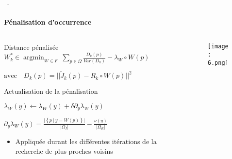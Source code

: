 \documentclass[aspectratio=169, 22pt]{beamer}
\DeclareMathOperator*{\argmin}{argmin}
\begin{document}
\begin{frame}{\secname~- \subsecname}
  \framesubtitle{Pénalisation d'occurrence}
  \begin{columns}
    \begin{column}{0.5\linewidth}
      \begin{block}{Distance pénalisée}
        \centering
        \small
        $W_k^* \in \argmin_{W \in F}\ \sum_{p \in \Omega} \frac{D_k(p)}{Var(D_k)} - \lambda_W \circ W(p)$
        
        $\text{avec} \quad D_k(p) = ||\tilde{J}_k(p) - R_k \circ W(p)||^2$
      \end{block}
      \vspace{1em}
      \begin{block}{Actualisation de la pénalisation}
        \small
        \begin{center}
          $\lambda_W(y) \leftarrow \lambda_W(y) + \delta \partial_y \lambda_W(y) $
          
          $\partial_y\lambda_W(y) = \frac{\lvert\left\{p\ |\ y =
              W(p)\right\}\rvert}{\lvert\Omega_I\rvert} -
          \frac{\nu(y)}{\lvert\Omega_R\rvert}$
        \end{center}
        
        \begin{itemize}
        \item Appliquée durant les différentes itérations de la recherche de plus proches voisins
        \end{itemize}
      \end{block}    
    \end{column}
    
    \begin{column}{0.5\linewidth}
      \begin{figure}
        \centering
        \texttt{[image: 6.png]}
      \end{figure}
    \end{column}
  \end{columns}
\end{frame}
\end{document}
